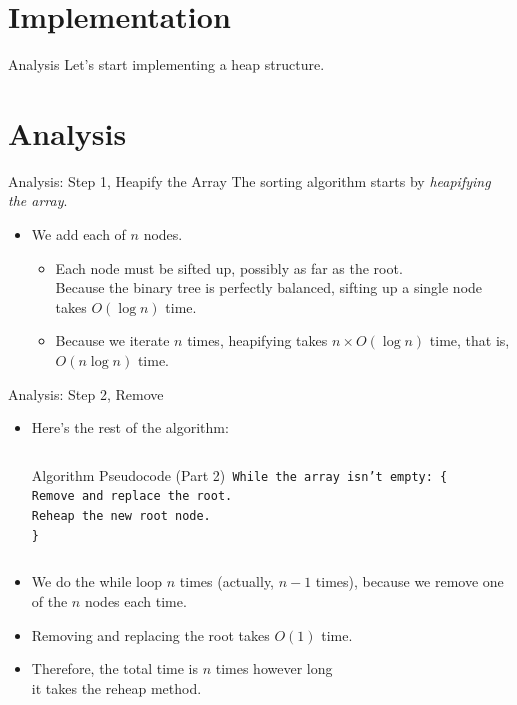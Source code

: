 \documentclass[14pt,aspectratio=1610]{beamer}
\begin{document}
\section*{Implementation}

\begin{frame}{Analysis}\Large\centering
Let's start implementing a heap structure.
\end{frame}

\section{Analysis}

\begin{frame}{Analysis: Step 1, Heapify the Array}
The sorting algorithm starts by \emph{heapifying the array}.
\begin{itemize}[<+->]
\item
  We add each of \(n\) nodes.
  \begin{itemize}
  \item
    Each node must be sifted up, possibly as far as the root.\\
    Because the binary tree is perfectly balanced, sifting up a single node takes \(O(\log n)\) time.
  \item
    Because we iterate \(n\) times, heapifying takes \(n \times O(\log n)\) time, that is, \(O(n \log n)\) time.
  \end{itemize}
\end{itemize}
\end{frame}

\begin{frame}{Analysis: Step 2, Remove}
\begin{itemize}
\item<1->
  Here's the rest of the algorithm:
  \begin{columns}
  \begin{block}{Algorithm Pseudocode (Part 2)}\texttt{%
    While the array isn't empty: \{\\
    \hspace{2em}Remove and replace the root.\\
    \hspace{2em}Reheap the new root node.\\
    \}}
  \end{block}
  \end{columns}

\item<2->
  We do the while loop \(n\) times (actually, \(n-1\) times), because we remove one of the \(n\) nodes each time.
\item<3->
  Removing and replacing the root takes \(O(1)\) time.
\item<4->
  Therefore, the total time is \(n\) times however long\\ it takes the reheap method.
\end{itemize}
\end{frame}
\end{document}
